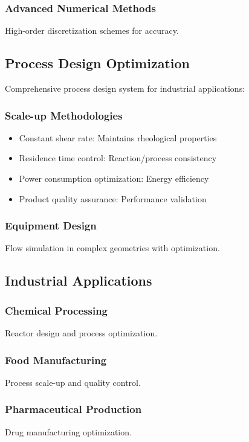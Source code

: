 \documentclass[11pt,a4paper]{article}
\begin{document}
\subsubsection{Advanced Numerical Methods}
High-order discretization schemes for accuracy.

\subsection{Process Design Optimization}

Comprehensive process design system for industrial applications:

\subsubsection{Scale-up Methodologies}
\begin{itemize}
    \item Constant shear rate: Maintains rheological properties
    \item Residence time control: Reaction/process consistency
    \item Power consumption optimization: Energy efficiency
    \item Product quality assurance: Performance validation
\end{itemize}

\subsubsection{Equipment Design}
Flow simulation in complex geometries with optimization.

\subsection{Industrial Applications}

\subsubsection{Chemical Processing}
Reactor design and process optimization.

\subsubsection{Food Manufacturing}
Process scale-up and quality control.

\subsubsection{Pharmaceutical Production}
Drug manufacturing optimization.
\end{document}
